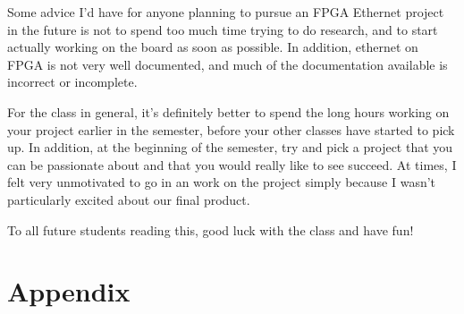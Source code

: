 \documentclass[12pt]{report}
\begin{document}
Some advice I'd have for anyone planning to pursue an FPGA Ethernet project in the future is not to spend too much time trying to do research, and to start actually working on the board as soon as possible. In addition, ethernet on FPGA is not very well documented, and much of the documentation available is incorrect or incomplete.

For the class in general, it's definitely better to spend the long hours working on your project earlier in the semester, before your other classes have started to pick up. In addition, at the beginning of the semester, try and pick a project that you can be passionate about and that you would really like to see succeed. At times, I felt very unmotivated to go in an work on the project simply because I wasn't particularly excited about our final product.

To all future students reading this, good luck with the class and have fun!

\printbibliography
\appendix
\chapter{Appendix}
\end{document}
